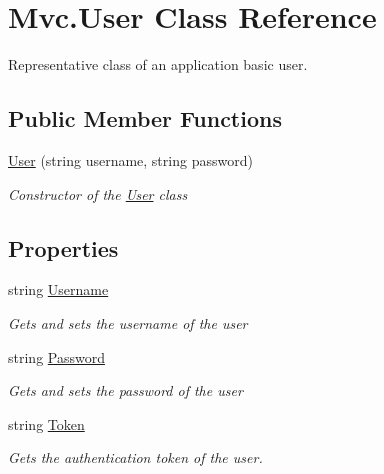 \hypertarget{class_mvc_1_1_user}{}\section{Mvc.\+User Class Reference}
\label{class_mvc_1_1_user}


Representative class of an application basic user.  


\subsection*{Public Member Functions}
\begin{DoxyCompactItemize}
\item 
\hyperlink{class_mvc_1_1_user_a951af2a43011db1d2deb581e50a9e6ee}{User} (string username, string password)
\begin{DoxyCompactList}\small\item\em Constructor of the \hyperlink{class_mvc_1_1_user}{User} class \end{DoxyCompactList}\end{DoxyCompactItemize}
\subsection*{Properties}
\begin{DoxyCompactItemize}
\item 
string \hyperlink{class_mvc_1_1_user_a14126ed3932866cb7a0ab76ea3f79125}{Username}
\begin{DoxyCompactList}\small\item\em Gets and sets the username of the user \end{DoxyCompactList}\item 
string \hyperlink{class_mvc_1_1_user_af53cf70ba371cde36137573c906981a7}{Password}
\begin{DoxyCompactList}\small\item\em Gets and sets the password of the user \end{DoxyCompactList}\item 
string \hyperlink{class_mvc_1_1_user_a03f1acccda5ea5fd895526a53478c130}{Token}
\begin{DoxyCompactList}\small\item\em Gets the authentication token of the user. \end{DoxyCompactList}\end{DoxyCompactItemize}


